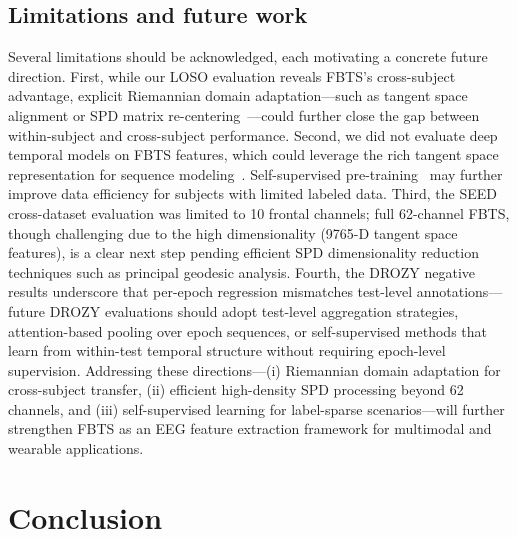 \documentclass{iopjournal}
\begin{document}
\subsection{Limitations and future work}

Several limitations should be acknowledged, each motivating a concrete future direction. First, while our LOSO evaluation reveals FBTS's cross-subject advantage, explicit Riemannian domain adaptation---such as tangent space alignment or SPD matrix re-centering~\cite{zanini2018transfer}---could further close the gap between within-subject and cross-subject performance. Second, we did not evaluate deep temporal models on FBTS features, which could leverage the rich tangent space representation for sequence modeling~\cite{zhang2016continuous,pan2024dcat}. Self-supervised pre-training~\cite{wang2024selfsupervised} may further improve data efficiency for subjects with limited labeled data. Third, the SEED cross-dataset evaluation was limited to 10 frontal channels; full 62-channel FBTS, though challenging due to the high dimensionality (9765-D tangent space features), is a clear next step pending efficient SPD dimensionality reduction techniques such as principal geodesic analysis. Fourth, the DROZY negative results underscore that per-epoch regression mismatches test-level annotations---future DROZY evaluations should adopt test-level aggregation strategies, attention-based pooling over epoch sequences, or self-supervised methods that learn from within-test temporal structure without requiring epoch-level supervision. Addressing these directions---(i) Riemannian domain adaptation for cross-subject transfer, (ii) efficient high-density SPD processing beyond 62 channels, and (iii) self-supervised learning for label-sparse scenarios---will further strengthen FBTS as an EEG feature extraction framework for multimodal and wearable applications.

\section{Conclusion}
\end{document}
